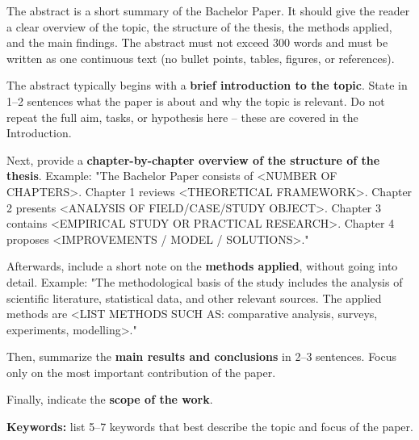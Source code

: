 \frontmatterpage
{}

The abstract is a short summary of the Bachelor Paper. It should give the reader a clear overview of the topic, the structure of the thesis, the methods applied, and the main findings. The abstract must not exceed 300 words and must be written as one continuous text (no bullet points, tables, figures, or references).  

The abstract typically begins with a \textbf{brief introduction to the topic}. State in 1–2 sentences what the paper is about and why the topic is relevant. Do not repeat the full aim, tasks, or hypothesis here – these are covered in the Introduction.  

Next, provide a \textbf{chapter-by-chapter overview of the structure of the thesis}.  
Example:  
"The Bachelor Paper consists of <NUMBER OF CHAPTERS>. Chapter 1 reviews <THEORETICAL FRAMEWORK>. Chapter 2 presents <ANALYSIS OF FIELD/CASE/STUDY OBJECT>. Chapter 3 contains <EMPIRICAL STUDY OR PRACTICAL RESEARCH>. Chapter 4 proposes <IMPROVEMENTS / MODEL / SOLUTIONS>."  

Afterwards, include a short note on the \textbf{methods applied}, without going into detail.  
Example:  
"The methodological basis of the study includes the analysis of scientific literature, statistical data, and other relevant sources. The applied methods are <LIST METHODS SUCH AS: comparative analysis, surveys, experiments, modelling>."  

Then, summarize the \textbf{main results and conclusions} in 2–3 sentences. Focus only on the most important contribution of the paper.  

Finally, indicate the \textbf{scope of the work}.  
\thesisscopeEN

\textbf{Keywords:} list 5–7 keywords that best describe the topic and focus of the paper.
